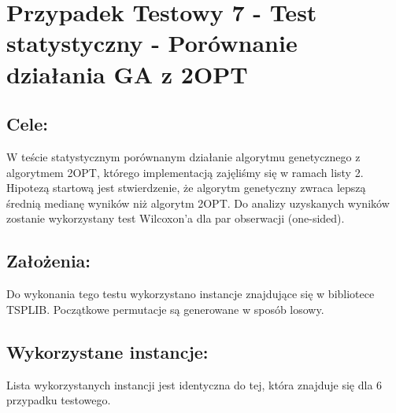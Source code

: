 \section{Przypadek Testowy 7 - Test statystyczny - Porównanie działania GA z 2OPT}
  \subsection{Cele:}
  W teście statystycznym porównanym działanie algorytmu genetycznego z algorytmem 2OPT,
  którego implementacją zajęliśmy się w ramach listy 2. Hipotezą startową jest stwierdzenie, że
  algorytm genetyczny zwraca lepszą średnią medianę wyników niż algorytm 2OPT. Do analizy
  uzyskanych wyników zostanie wykorzystany test Wilcoxon'a dla par obserwacji (one-sided).
  \subsection{Założenia: }
  Do wykonania tego testu wykorzystano instancje znajdujące się w bibliotece TSPLIB. Początkowe permutacje są generowane w sposób
  losowy.
  \subsection{Wykorzystane instancje: }
  Lista wykorzystanych instancji jest identyczna do tej, która znajduje się dla 6 przypadku testowego.
